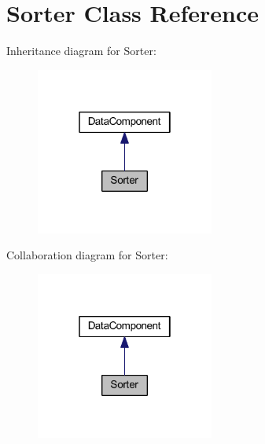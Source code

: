 \hypertarget{classhamburgscleanest_1_1_data_tables_1_1_models_1_1_data_components_1_1_sorter}{}\section{Sorter Class Reference}
\label{classhamburgscleanest_1_1_data_tables_1_1_models_1_1_data_components_1_1_sorter}


Inheritance diagram for Sorter\+:\nopagebreak
\begin{figure}[H]
\begin{center}
\leavevmode
\includegraphics[width=166pt]{classhamburgscleanest_1_1_data_tables_1_1_models_1_1_data_components_1_1_sorter__inherit__graph}
\end{center}
\end{figure}


Collaboration diagram for Sorter\+:\nopagebreak
\begin{figure}[H]
\begin{center}
\leavevmode
\includegraphics[width=166pt]{classhamburgscleanest_1_1_data_tables_1_1_models_1_1_data_components_1_1_sorter__coll__graph}
\end{center}
\end{figure}
